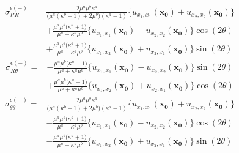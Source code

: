 \begin{align}
	\sigma_{RR}^{\epsilon(-)} =
	&\frac{2\mu^{a}\mu^{b}\kappa^{a}}{\bigl(\mu^{a}(\kappa^{b}-1)+2\mu^{b}\bigr)(\kappa^{a}-1)}
	\bigl\{u_{x_{1},x_{1}}(\bm{x_{0}})+u_{x_{2},x_{2}}(\bm{x_{0}})\bigr\}
	\nonumber
	\\
	&+\frac{\mu^{a}\mu^{b}\bigl(\kappa^{a}+1\bigr)}{\mu^{a}+\kappa^{a}\mu^{b}}
	\bigl\{u_{x_{1},x_{1}}(\bm{x_{0}})-u_{x_{2},x_{2}}(\bm{x_{0}})\bigr\}\cos(2\theta)
	\nonumber
	\\
	&+\frac{\mu^{a}\mu^{b}\bigl(\kappa^{a}+1\bigr)}{\mu^{a}+\kappa^{a}\mu^{b}}
	\bigl\{u_{x_{1},x_{2}}(\bm{x_{0}})+u_{x_{2},x_{1}}(\bm{x_{0}})\bigr\}\sin(2\theta)
	\label{eq:SigmaRRInEpsSol}
\end{align}
\begin{align}
	\sigma_{R\theta}^{\epsilon(-)} =
	&-\frac{\mu^{a}\mu^{b}\bigl(\kappa^{a}+1\bigr)}{\mu^{a}+\kappa^{a}\mu^{b}}
	\bigl\{u_{x_{1},x_{1}}(\bm{x_{0}})-u_{x_{2},x_{2}}(\bm{x_{0}})\bigr\}\sin(2\theta)
	\nonumber
	\\
	&+\frac{\mu^{a}\mu^{b}\bigl(\kappa^{a}+1\bigr)}{\mu^{a}+\kappa^{a}\mu^{b}}
	\bigl\{u_{x_{1},x_{2}}(\bm{x_{0}})+u_{x_{2},x_{1}}(\bm{x_{0}})\bigr\}\cos(2\theta)
	\label{eq:SigmaRThInEpsSol}
\end{align}
\begin{align}
	\sigma_{\theta\theta}^{\epsilon(-)} =
	&\frac{2\mu^{a}\mu^{b}\kappa^{a}}{\bigl(\mu^{a}(\kappa^{b}-1)+2\mu^{b}\bigr)(\kappa^{a}-1)}
	\bigl\{u_{x_{1},x_{1}}(\bm{x_{0}})+u_{x_{2},x_{2}}(\bm{x_{0}})\bigr\}
	\nonumber
	\\
	&-\frac{\mu^{a}\mu^{b}\bigl(\kappa^{a}+1\bigr)}{\mu^{a}+\kappa^{a}\mu^{b}}
	\bigl\{u_{x_{1},x_{1}}(\bm{x_{0}})-u_{x_{2},x_{2}}(\bm{x_{0}})\bigr\}\cos(2\theta)
	\nonumber
	\\
	&-\frac{\mu^{a}\mu^{b}\bigl(\kappa^{a}+1\bigr)}{\mu^{a}+\kappa^{a}\mu^{b}}
	\bigl\{u_{x_{1},x_{2}}(\bm{x_{0}})+u_{x_{2},x_{1}}(\bm{x_{0}})\bigr\}\sin(2\theta)
	\label{eq:SigmaThThInEpsSol}
\end{align}

